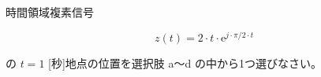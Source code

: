 時間領域複素信号 

\[
z(t) = 2 \cdot t \cdot \textrm{e}^{ j \cdot \pi/2 \cdot t }
\]

\medskip
\noindent の $t = 1$ [秒]地点の位置を選択肢 a〜d の中から1つ選びなさい。
